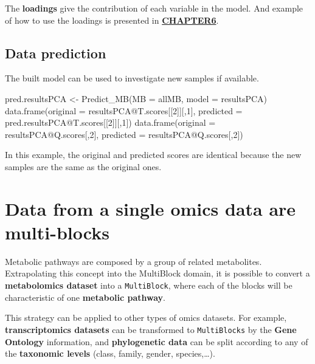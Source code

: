 \documentclass[
]{book}
\newenvironment{Shaded}{\begin{snugshade}}{\end{snugshade}}
\newcommand{\AttributeTok}[1]{\textcolor[rgb]{0.77,0.63,0.00}{#1}}
\newcommand{\DecValTok}[1]{\textcolor[rgb]{0.00,0.00,0.81}{#1}}
\newcommand{\FunctionTok}[1]{\textcolor[rgb]{0.00,0.00,0.00}{#1}}
\newcommand{\NormalTok}[1]{#1}
\newcommand{\OtherTok}[1]{\textcolor[rgb]{0.56,0.35,0.01}{#1}}
\newcommand{\SpecialCharTok}[1]{\textcolor[rgb]{0.00,0.00,0.00}{#1}}
\begin{document}
The \textbf{loadings} give the contribution of each variable in the model.
And example of how to use the loadings is presented in \href{https://f-puig.github.io/R.ComDim.Docs/Section5.html}{\textbf{CHAPTER6}}.

\hypertarget{PART3}{%
\section{Data prediction}\label{PART3}}

The built model can be used to investigate new samples if available.

\begin{Shaded}
\begin{Highlighting}[]
\NormalTok{pred.resultsPCA }\OtherTok{\textless{}{-}} \FunctionTok{Predict\_MB}\NormalTok{(}\AttributeTok{MB =}\NormalTok{ allMB, }\AttributeTok{model =}\NormalTok{ resultsPCA)}
\FunctionTok{data.frame}\NormalTok{(}\AttributeTok{original =}\NormalTok{ resultsPCA}\SpecialCharTok{@}\NormalTok{T.scores[[}\DecValTok{2}\NormalTok{]][,}\DecValTok{1}\NormalTok{],}
           \AttributeTok{predicted =}\NormalTok{ pred.resultsPCA}\SpecialCharTok{@}\NormalTok{T.scores[[}\DecValTok{2}\NormalTok{]][,}\DecValTok{1}\NormalTok{])}
\FunctionTok{data.frame}\NormalTok{(}\AttributeTok{original =}\NormalTok{ resultsPCA}\SpecialCharTok{@}\NormalTok{Q.scores[,}\DecValTok{2}\NormalTok{],}
           \AttributeTok{predicted =}\NormalTok{ resultsPCA}\SpecialCharTok{@}\NormalTok{Q.scores[,}\DecValTok{2}\NormalTok{])}
\end{Highlighting}
\end{Shaded}

In this example, the original and predicted scores are identical because the
new samples are the same as the original ones.

\hypertarget{Section5}{%
\chapter{Data from a single omics data are multi-blocks}\label{Section5}}

Metabolic pathways are composed by a group of related metabolites. Extrapolating
this concept into the MultiBlock domain, it is possible to convert a
\textbf{metabolomics dataset} into a \texttt{MultiBlock}, where each of the blocks will be
characteristic of one \textbf{metabolic pathway}.

This strategy can be applied to other types of omics datasets. For example,
\textbf{transcriptomics datasets} can be transformed to \texttt{MultiBlocks} by the
\textbf{Gene Ontology} information, and \textbf{phylogenetic data} can be split according
to any of the \textbf{taxonomic levels} (class, family, gender, species,\ldots).
\end{document}
